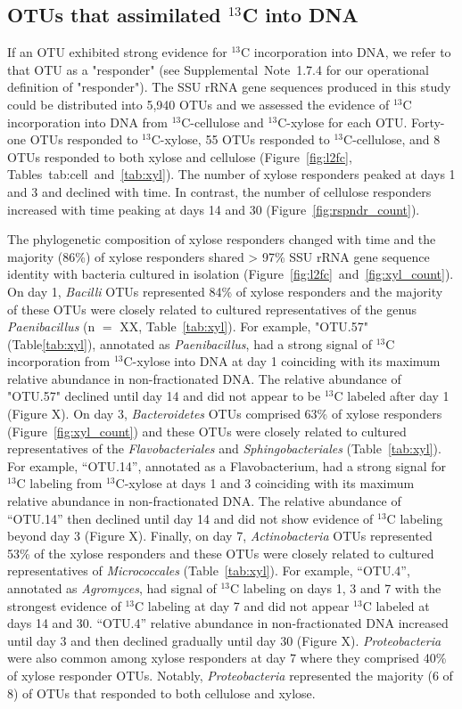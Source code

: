 \subsection{OTUs that assimilated $^{13}$C into DNA} \label{responders}
If an OTU exhibited strong evidence for $^{13}$C incorporation into DNA, we
refer to that OTU as a "responder" (see Supplemental Note 1.7.4 for our
operational definition of "responder"). The SSU rRNA gene sequences produced in
this study could be distributed into 5,940 OTUs and we assessed the evidence of
$^{13}$C incorporation into DNA from $^{13}$C-cellulose and
$^{13}$C-xylose for each OTU. Forty-one OTUs responded to $^{13}$C-xylose,
55 OTUs responded to $^{13}$C-cellulose, and 8 OTUs 
responded to both xylose and cellulose (Figure~\ref{fig:l2fc},
Tables~{tab:cell}~and~\ref{tab:xyl}). The number of xylose responders
peaked at days 1 and 3 and declined with time. In contrast, the number of
cellulose responders increased with time peaking at days 14 and 30
(Figure~\ref{fig:rspndr_count}). 

The phylogenetic composition of xylose responders changed with time and the
majority (86\%) of xylose responders shared > 97\% SSU rRNA gene sequence
identity with bacteria cultured in isolation
(Figure~\ref{fig:l2fc}~and~\ref{fig:xyl_count}). On day 1, \textit{Bacilli}
OTUs represented 84\% of xylose responders and the majority of these OTUs were
closely related to cultured representatives of the genus \textit{Paenibacillus}
(n $=$ XX, Table~\ref{tab:xyl}). For example, "OTU.57" (Table\ref{tab:xyl}),
annotated as \textit{Paenibacillus}, had a strong signal of $^{13}$C
incorporation from $^{13}$C-xylose into DNA at day 1 coinciding with its
maximum relative abundance in non-fractionated DNA. The relative abundance
of "OTU.57" declined until day 14 and did not appear to be $^{13}$C labeled
after day 1 (Figure X). On day 3, \textit{Bacteroidetes} OTUs comprised 63\% of
xylose responders (Figure~\ref{fig:xyl_count}) and these OTUs were closely
related to cultured representatives of the \textit{Flavobacteriales} and
\textit{Sphingobacteriales} (Table~\ref{tab:xyl}). For example, ``OTU.14'',
annotated as a Flavobacterium, had a strong signal for $^{13}$C labeling from
$^{13}$C-xylose at days 1 and 3 coinciding with its maximum relative abundance
in non-fractionated DNA. The relative abundance of ``OTU.14'' then declined
until day 14 and did not show evidence of $^{13}$C labeling beyond day
3 (Figure X). Finally, on day 7, \textit{Actinobacteria} OTUs represented 53\%
of the xylose responders and these OTUs were closely related to cultured
representatives of \textit{Micrococcales} (Table~\ref{tab:xyl}). For example,
``OTU.4'', annotated as \textit{Agromyces}, had signal of $^{13}$C labeling on
days 1, 3 and 7 with the strongest evidence of $^{13}$C labeling at day
7 and did not appear $^{13}$C labeled at days 14 and 30. ``OTU.4'' relative
abundance in non-fractionated DNA increased until day 3 and then declined
gradually until day 30 (Figure X). \textit{Proteobacteria} were also common
among xylose responders at day 7 where they comprised 40\% of xylose responder
OTUs. Notably, \textit{Proteobacteria} represented the majority (6 of 8) of
OTUs that responded to both cellulose and xylose. 

